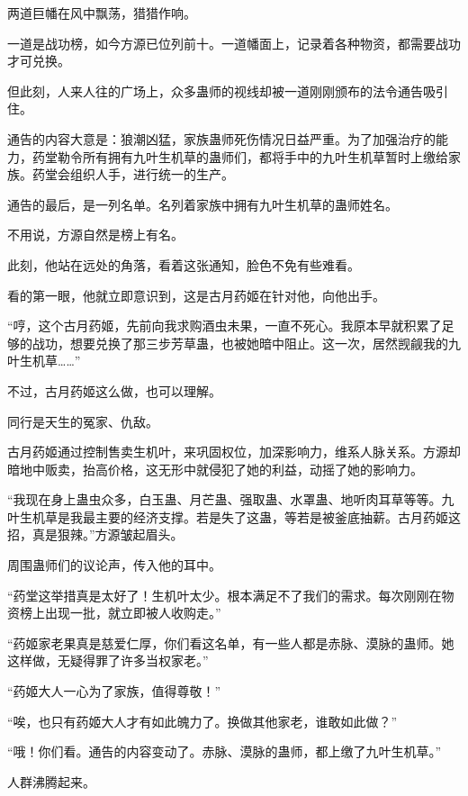 
\begin{this_body}



两道巨幡在风中飘荡，猎猎作响。

一道是战功榜，如今方源已位列前十。一道幡面上，记录着各种物资，都需要战功才可兑换。

但此刻，人来人往的广场上，众多蛊师的视线却被一道刚刚颁布的法令通告吸引住。

通告的内容大意是：狼潮凶猛，家族蛊师死伤情况日益严重。为了加强治疗的能力，药堂勒令所有拥有九叶生机草的蛊师们，都将手中的九叶生机草暂时上缴给家族。药堂会组织人手，进行统一的生产。

通告的最后，是一列名单。名列着家族中拥有九叶生机草的蛊师姓名。

不用说，方源自然是榜上有名。

此刻，他站在远处的角落，看着这张通知，脸色不免有些难看。

看的第一眼，他就立即意识到，这是古月药姬在针对他，向他出手。

“哼，这个古月药姬，先前向我求购酒虫未果，一直不死心。我原本早就积累了足够的战功，想要兑换了那三步芳草蛊，也被她暗中阻止。这一次，居然觊觎我的九叶生机草……”

不过，古月药姬这么做，也可以理解。

同行是天生的冤家、仇敌。

古月药姬通过控制售卖生机叶，来巩固权位，加深影响力，维系人脉关系。方源却暗地中贩卖，抬高价格，这无形中就侵犯了她的利益，动摇了她的影响力。

“我现在身上蛊虫众多，白玉蛊、月芒蛊、强取蛊、水罩蛊、地听肉耳草等等。九叶生机草是我最主要的经济支撑。若是失了这蛊，等若是被釜底抽薪。古月药姬这招，真是狠辣。”方源皱起眉头。

周围蛊师们的议论声，传入他的耳中。

“药堂这举措真是太好了！生机叶太少。根本满足不了我们的需求。每次刚刚在物资榜上出现一批，就立即被人收购走。”

“药姬家老果真是慈爱仁厚，你们看这名单，有一些人都是赤脉、漠脉的蛊师。她这样做，无疑得罪了许多当权家老。”

“药姬大人一心为了家族，值得尊敬！”

“唉，也只有药姬大人才有如此魄力了。换做其他家老，谁敢如此做？”

“哦！你们看。通告的内容变动了。赤脉、漠脉的蛊师，都上缴了九叶生机草。”

人群沸腾起来。


\end{this_body}
